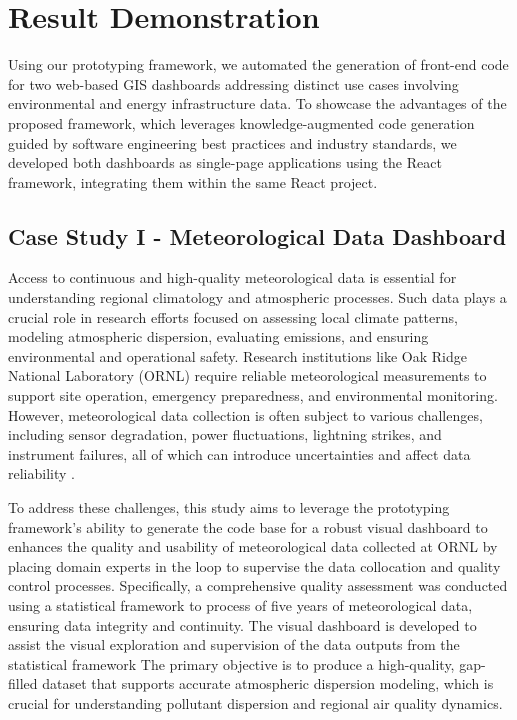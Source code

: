 \section{Result Demonstration}
\label{subsec:Data}
Using our prototyping framework, we automated the generation of front-end code for two web-based GIS dashboards addressing distinct use cases involving environmental and energy infrastructure data. To showcase the advantages of the proposed framework, which leverages knowledge-augmented code generation guided by software engineering best practices and industry standards, we developed both dashboards as single-page applications using the React framework, integrating them within the same React project. 

\subsection{Case Study I - Meteorological Data Dashboard}
Access to continuous and high-quality meteorological data is essential for understanding regional climatology and atmospheric processes. Such data plays a crucial role in research efforts focused on assessing local climate patterns, modeling atmospheric dispersion, evaluating emissions, and ensuring environmental and operational safety. Research institutions like Oak Ridge National Laboratory (ORNL) require reliable meteorological measurements to support site operation, emergency preparedness, and environmental monitoring. However, meteorological data collection is often subject to various challenges, including sensor degradation, power fluctuations, lightning strikes, and instrument failures, all of which can introduce uncertainties and affect data reliability \citep{steckler_2025}. 

To address these challenges, this study aims to leverage the prototyping framework's ability to generate the code base for a robust visual dashboard to enhances the quality and usability of meteorological data collected at ORNL by placing domain experts in the loop to supervise the data collocation and quality control processes. Specifically, a comprehensive quality assessment was conducted using a statistical framework to process of five years of meteorological data, ensuring data integrity and continuity. The visual dashboard is developed to assist the visual exploration and supervision of the data outputs from the statistical framework 
The primary objective is to produce a high-quality, gap-filled dataset that supports accurate atmospheric dispersion modeling, which is crucial for understanding pollutant dispersion and regional air quality dynamics.

